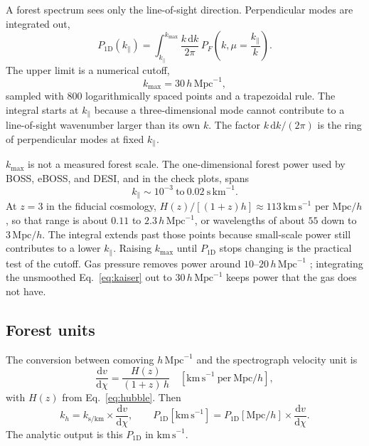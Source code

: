 \documentclass[11pt]{article}
\begin{document}
A forest spectrum sees only the line-of-sight direction. Perpendicular modes are integrated out,
\begin{equation}
\label{eq:p1d-kaiser}
P_{1\mathrm{D}}(k_\parallel)
=
\int_{k_\parallel}^{k_\mathrm{max}}
\frac{k\,\mathrm{d}k}{2\pi}\,
P_F\!\left(k,\mu=\frac{k_\parallel}{k}\right).
\end{equation}
The upper limit is a numerical cutoff,
\begin{equation}
k_\mathrm{max} = 30\,h\,\mathrm{Mpc}^{-1},
\end{equation}
sampled with 800 logarithmically spaced points and a trapezoidal rule. The integral starts at $k_\parallel$ because a three-dimensional mode cannot contribute to a line-of-sight wavenumber larger than its own $k$. The factor $k\,\mathrm{d}k/(2\pi)$ is the ring of perpendicular modes at fixed $k_\parallel$.

$k_\mathrm{max}$ is not a measured forest scale. The one-dimensional forest power used by BOSS, eBOSS, and DESI, and in the check plots, spans
\begin{equation}
k_\parallel \sim 10^{-3}\ \mathrm{to}\ 0.02\ \mathrm{s\,km}^{-1}.
\end{equation}
At $z=3$ in the fiducial cosmology, $H(z)/[(1+z)h]\approx 113\,\mathrm{km\,s}^{-1}$ per $\mathrm{Mpc}/h$, so that range is about $0.11$ to $2.3\,h\,\mathrm{Mpc}^{-1}$, or wavelengths of about $55$ down to $3\,\mathrm{Mpc}/h$. The integral extends past those points because small-scale power still contributes to a lower $k_\parallel$. Raising $k_\mathrm{max}$ until $P_{1\mathrm{D}}$ stops changing is the practical test of the cutoff. Gas pressure removes power around $10$--$20\,h\,\mathrm{Mpc}^{-1}$ \cite{McDonald:2001fe}; integrating the unsmoothed Eq.~\eqref{eq:kaiser} out to $30\,h\,\mathrm{Mpc}^{-1}$ keeps power that the gas does not have.

\subsection{Forest units}

The conversion between comoving $h\,\mathrm{Mpc}^{-1}$ and the spectrograph velocity unit is
\begin{equation}
\label{eq:units}
\frac{\mathrm{d}v}{\mathrm{d}\chi}
=
\frac{H(z)}{(1+z)\,h}
\quad[\mathrm{km\,s}^{-1}\ \mathrm{per}\ \mathrm{Mpc}/h],
\end{equation}
with $H(z)$ from Eq.~\eqref{eq:hubble}. Then
\begin{equation}
k_h = k_{\mathrm{s/km}}\times \frac{\mathrm{d}v}{\mathrm{d}\chi},
\qquad
P_{1\mathrm{D}}[\mathrm{km\,s}^{-1}]
=
P_{1\mathrm{D}}[\mathrm{Mpc}/h]\times \frac{\mathrm{d}v}{\mathrm{d}\chi}.
\end{equation}
The analytic output is this $P_{1\mathrm{D}}$ in $\mathrm{km\,s}^{-1}$.
\end{document}
